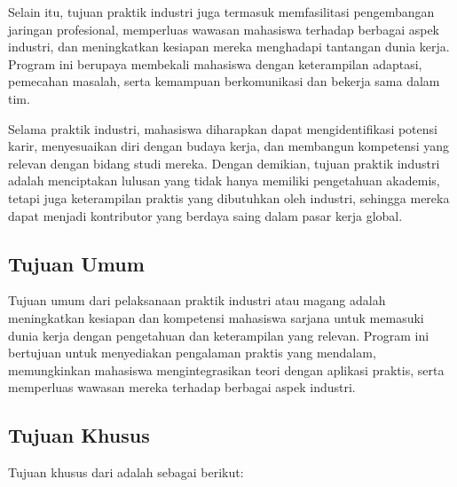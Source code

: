 Selain itu, tujuan praktik industri juga termasuk memfasilitasi pengembangan jaringan profesional, memperluas wawasan mahasiswa terhadap berbagai aspek industri, dan meningkatkan kesiapan mereka menghadapi tantangan dunia kerja. Program ini berupaya membekali mahasiswa dengan keterampilan adaptasi, pemecahan masalah, serta kemampuan berkomunikasi dan bekerja sama dalam tim.

Selama praktik industri, mahasiswa diharapkan dapat mengidentifikasi potensi karir, menyesuaikan diri dengan budaya kerja, dan membangun kompetensi yang relevan dengan bidang studi mereka. Dengan demikian, tujuan praktik industri adalah menciptakan lulusan yang tidak hanya memiliki pengetahuan akademis, tetapi juga keterampilan praktis yang dibutuhkan oleh industri, sehingga mereka dapat menjadi kontributor yang berdaya saing dalam pasar kerja global.

\subsection{Tujuan Umum}

Tujuan umum dari pelaksanaan praktik industri atau magang adalah meningkatkan kesiapan dan kompetensi mahasiswa sarjana untuk memasuki dunia kerja dengan pengetahuan dan keterampilan yang relevan. Program ini bertujuan untuk menyediakan pengalaman praktis yang mendalam, memungkinkan mahasiswa mengintegrasikan teori dengan aplikasi praktis, serta memperluas wawasan mereka terhadap berbagai aspek industri.

\subsection{Tujuan Khusus}

Tujuan khusus dari \tipe adalah sebagai berikut:

